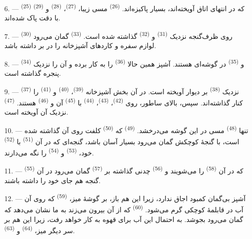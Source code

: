 6. ---  \textsuperscript{(25)} که در انتهای اتاق
آویخته‌اند، بسیار پاکیزه‌اند.  \textsuperscript{(26)}
مسی زیبا،  \textsuperscript{(27)}، 
\textsuperscript{(28)} و  \textsuperscript{(29)} با دقت
پاک شده‌اند.

7. ---  \textsuperscript{(30)} روی ظرف‌گنجه نزدیک
 \textsuperscript{(31)} و 
\textsuperscript{(32)} گذاشته شده است. 
\textsuperscript{(33)} گمان می‌رود لوازم سفره و کاردهای آشپزخانه را در
بر داشته باشد.

8. ---  \textsuperscript{(34)} و 
\textsuperscript{(35)} در گوشه‌ای هستند. آشپز همین حالا  \textsuperscript{(36)} را به کار برده و آن را نزدیک پنجره گذاشته
است.

9. ---  \textsuperscript{(37)} نزدیک 
\textsuperscript{(38)} بر دیوار آویخته است. در آن بخش آشپزخانه
 \textsuperscript{(39)}، 
\textsuperscript{(40)} و  \textsuperscript{(41)}
را کنار گذاشته‌اند. سپس، بالای ساطور، روی 
\textsuperscript{(42)}،  \textsuperscript{(43)}،
 \textsuperscript{(44)} با 
\textsuperscript{(45)} آن و  \textsuperscript{(46)}
هستند.  \textsuperscript{(47)} نزدیک آن آویخته است.

10. --- تنها  \textsuperscript{(48)} مسی در این گوشه
می‌درخشد.  \textsuperscript{(49)} که 
\textsuperscript{(50)} کلفت روی آن گذاشته شده است، با گنجهٔ کوچکش
گمان می‌رود بسیار آسان باشد، گنجه‌ای که در آن 
\textsuperscript{(51)} با  \textsuperscript{(52)} خود،
 \textsuperscript{(53)} و 
\textsuperscript{(54)} را نگه می‌دارند.

\VUsaut{4.0mm}
\VUsaut{3.0mm}

11. ---  \textsuperscript{(55)} که در آن
 \textsuperscript{(58)} را می‌شویند و 
\textsuperscript{(56)} چدنی گذاشته بر 
\textsuperscript{(57)} گمان می‌رود در آن گنجه هم جای خود را داشته
باشند.

12. --- آشپز بی‌گمان کمبود اجاق ندارد، زیرا این هم باز، بر گوشهٔ میز،
 \textsuperscript{(59)} که روی آن آب در قابلمهٔ
کوچکی گرم می‌شود.  \textsuperscript{(60)} که از آن
بیرون می‌زند به ما نشان می‌دهد که گمان می‌رود بجوشد. به احتمال این آب
برای قهوه به کار خواهد رفت، زیرا این هم بر سر دیگر میز،
 \textsuperscript{(64)} و 
\textsuperscript{(63)}.

